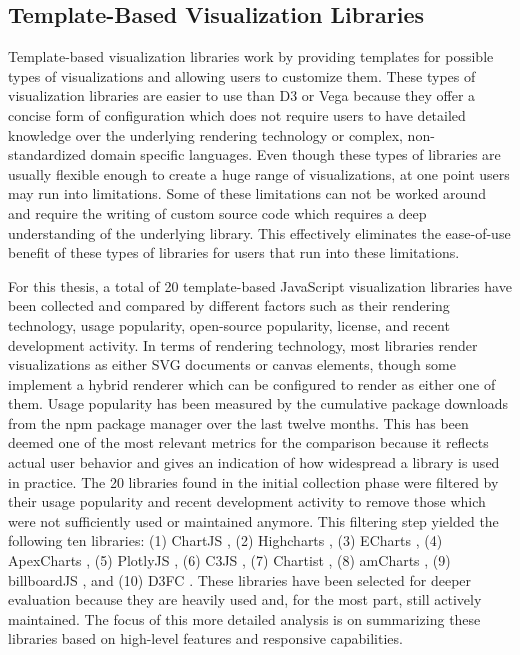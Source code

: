 \subsection{Template-Based Visualization Libraries}

Template-based visualization libraries work by providing templates for possible types of visualizations and allowing users to customize them.
These types of visualization libraries are easier to use than D3 or Vega because they offer a concise form of configuration which does not require users to have detailed knowledge over the underlying rendering technology or complex, non-standardized domain specific languages.
Even though these types of libraries are usually flexible enough to create a huge range of visualizations, at one point users may run into limitations.
Some of these limitations can not be worked around and require the writing of custom source code which requires a deep understanding of the underlying library.
This effectively eliminates the ease-of-use benefit of these types of libraries for users that run into these limitations.

For this thesis, a total of 20 template-based JavaScript visualization libraries have been collected and compared by different factors such as their rendering technology, usage popularity, open-source popularity, license, and recent development activity.
In terms of rendering technology, most libraries render visualizations as either SVG documents or canvas elements, though some implement a hybrid renderer which can be configured to render as either one of them.
Usage popularity has been measured by the cumulative package downloads from the npm package manager over the last twelve months.
This has been deemed one of the most relevant metrics for the comparison because it reflects actual user behavior and gives an indication of how widespread a library is used in practice.
The 20 libraries found in the initial collection phase were filtered by their usage popularity and recent development activity to remove those which were not sufficiently used or maintained anymore.
This filtering step yielded the following ten libraries: (1) ChartJS \parencite{ChartJS}, (2) Highcharts \parencite{Highcharts}, (3) ECharts \parencite{ECharts}, (4) ApexCharts \parencite{ApexCharts}, (5) PlotlyJS \parencite{PlotlyJS}, (6) C3JS \parencite{C3JS}, (7) Chartist \parencite{Chartist}, (8) amCharts \parencite{amCharts}, (9) billboardJS \parencite{billboardJS}, and (10) D3FC \parencite{D3FC}.
These libraries have been selected for deeper evaluation because they are heavily used and, for the most part, still actively maintained.
The focus of this more detailed analysis is on summarizing these libraries based on high-level features and responsive capabilities.

